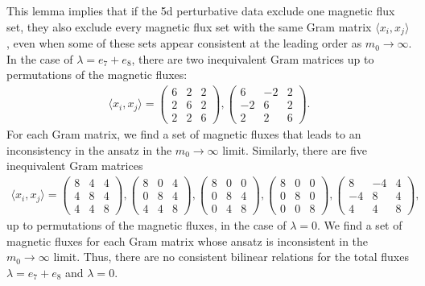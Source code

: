 \documentclass[11pt, a4paper]{article}
\theoremstyle{definition}
\begin{document}
This lemma implies that if the 5d perturbative data exclude one magnetic flux set, they also exclude every magnetic flux set with the same Gram matrix $ \langle x_i, x_j \rangle $, even when some of these sets appear consistent at the leading order as $ m_0 \to \infty $. In the case of $ \lambda = e_7+e_8 $, there are two inequivalent Gram matrices up to permutations of the magnetic fluxes:
\begin{align}
        \langle x_i, x_j \rangle =
        \begin{pmatrix}
            6 & 2 & 2 \\  2 & 6 & 2 \\ 2 & 2 & 6
        \end{pmatrix} ,
        \begin{pmatrix}
            6 & -2 & 2 \\  -2 & 6 & 2 \\ 2 & 2 & 6
        \end{pmatrix} .
\end{align}
For each Gram matrix, we find a set of magnetic fluxes that leads to an inconsistency in the ansatz in the $ m_0 \to \infty $ limit. Similarly, there are five inequivalent Gram matrices
\begin{align}
    \langle x_i, x_j \rangle = 
        \begin{pmatrix}
            8 & 4 & 4 \\ 4 & 8 & 4 \\ 4 & 4 & 8
        \end{pmatrix} ,
        \begin{pmatrix}
            8 & 0 & 4 \\ 0 & 8 & 4 \\ 4 & 4 & 8
        \end{pmatrix} ,
        \begin{pmatrix}
            8 & 0 & 0 \\ 0 & 8 & 4 \\ 0 & 4 & 8
        \end{pmatrix} ,
        \begin{pmatrix}
            8 & 0 & 0 \\ 0 & 8 & 0 \\ 0 & 0 & 8
        \end{pmatrix} ,
        \begin{pmatrix}
            8 & -4 & 4 \\ -4 & 8 & 4 \\ 4 & 4 & 8
        \end{pmatrix} ,
\end{align}
up to permutations of the magnetic fluxes, in the case of $ \lambda=0 $. We find a set of magnetic fluxes for each Gram matrix whose ansatz is inconsistent in the $ m_0 \to \infty $ limit. Thus, there are no consistent bilinear relations for the total fluxes $ \lambda=e_7+e_8 $ and $ \lambda=0 $.
\end{document}
